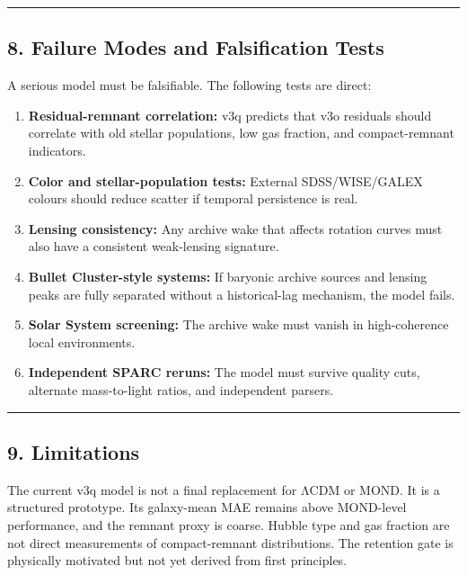 \documentclass[
]{article}
\providecommand{\tightlist}{%
  \setlength{\itemsep}{0pt}\setlength{\parskip}{0pt}}
\begin{document}
\begin{center}\rule{0.5\linewidth}{0.5pt}\end{center}

\subsection{8. Failure Modes and Falsification
Tests}\label{failure-modes-and-falsification-tests}

A serious model must be falsifiable. The following tests are direct:

\begin{enumerate}
\def\labelenumi{\arabic{enumi}.}
\tightlist
\item
  \textbf{Residual-remnant correlation:} v3q predicts that v3o residuals
  should correlate with old stellar populations, low gas fraction, and
  compact-remnant indicators.
\item
  \textbf{Color and stellar-population tests:} External SDSS/WISE/GALEX
  colours should reduce scatter if temporal persistence is real.
\item
  \textbf{Lensing consistency:} Any archive wake that affects rotation
  curves must also have a consistent weak-lensing signature.
\item
  \textbf{Bullet Cluster-style systems:} If baryonic archive sources and
  lensing peaks are fully separated without a historical-lag mechanism,
  the model fails.
\item
  \textbf{Solar System screening:} The archive wake must vanish in
  high-coherence local environments.
\item
  \textbf{Independent SPARC reruns:} The model must survive quality
  cuts, alternate mass-to-light ratios, and independent parsers.
\end{enumerate}

\begin{center}\rule{0.5\linewidth}{0.5pt}\end{center}

\subsection{9. Limitations}\label{limitations}

The current v3q model is not a final replacement for ΛCDM or MOND. It is
a structured prototype. Its galaxy-mean MAE remains above MOND-level
performance, and the remnant proxy is coarse. Hubble type and gas
fraction are not direct measurements of compact-remnant distributions.
The retention gate is physically motivated but not yet derived from
first principles.
\end{document}
